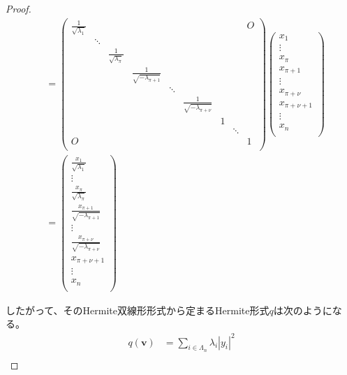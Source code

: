 \documentclass[dvipdfmx]{jsarticle}
\begin{document}
\begin{proof}
\begin{align*}
&= \begin{pmatrix}
\frac{1}{\sqrt{\lambda_{1}}} & \  & \  & \  & \  & \  & \  & \  & O \\
\  & \ddots & \  & \  & \  & \  & \  & \  & \  \\
\  & \  & \frac{1}{\sqrt{\lambda_{\pi}}} & \  & \  & \  & \  & \  & \  \\
\  & \  & \  & \frac{1}{\sqrt{- \lambda_{\pi + 1}}} & \  & \  & \  & \  & \  \\
\  & \  & \  & \  & \ddots & \  & \  & \  & \  \\
\  & \  & \  & \  & \  & \frac{1}{\sqrt{- \lambda_{\pi + \nu}}} & \  & \  & \  \\
\  & \  & \  & \  & \  & \  & 1 & \  & \  \\
\  & \  & \  & \  & \  & \  & \  & \ddots & \  \\
O & \  & \  & \  & \  & \  & \  & \  & 1 \\
\end{pmatrix}\begin{pmatrix}
x_{1} \\
 \vdots \\
x_{\pi} \\
x_{\pi + 1} \\
 \vdots \\
x_{\pi + \nu} \\
x_{\pi + \nu + 1} \\
 \vdots \\
x_{n} \\
\end{pmatrix}\\
&= \begin{pmatrix}
\frac{x_{1}}{\sqrt{\lambda_{1}}} \\
 \vdots \\
\frac{x_{\pi}}{\sqrt{\lambda_{\pi}}} \\
\frac{x_{\pi + 1}}{\sqrt{- \lambda_{\pi + 1}}} \\
 \vdots \\
\frac{x_{\pi + \nu}}{\sqrt{- \lambda_{\pi + \nu}}} \\
x_{\pi + \nu + 1} \\
 \vdots \\
x_{n} \\
\end{pmatrix}
\end{align*}\par
したがって、そのHermite双線形形式から定まるHermite形式$q$は次のようになる。
\begin{align*}
q\left( \mathbf{v} \right) &= \sum_{i \in \varLambda_{n}} {\lambda_{i}\left| y_{i} \right|^{2}}\\

\end{align*}
\end{proof}
\end{document}
